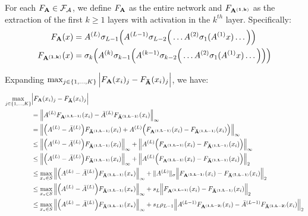 \noindent For each $F_{\bf A}\in\mathcal{F}_\mathcal{A}$, we define $F_{\bf A}$ as the entire network and $F_{\bf A^{(1, k)}}$ as the extraction of the first $k\ge 1$ layers with activation in the $k^{th}$ layer. Specifically:
\begin{align*}
    F_{\bf A}(x) &= A^{(L)}\sigma_{L-1}\Big( A^{(L-1)}\sigma_{L-2}\Big(  \dots A^{(2)}\sigma_1(A^{(1)}x) \dots \Big) \Big) \\   
    F_{\bf A^{(1, k)}}(x) &= \sigma_k\Big( 
        A^{(k)}\sigma_{k-1}\Big( A^{(k-1)}\sigma_{k-2}\Big( \dots A^{(2)}\sigma_1(A^{(1)}x) \dots \Big) \Big)
     \Big)
\end{align*}

\noindent Expanding $\max_{j\in\{1, \dots, K\}}\Big| F_{\bf A}(x_i)_j - F_{\bf \bar A}(x_i)_j \Big|$, we have:
\begin{align*}
    \max_{j\in\{1, \dots, K\}}&\Big|  F_{\bf A}(x_i)_j - F_{\bf \bar A}(x_i)_j  \Big| \\
        &=  \Big\|
            A^{(L)}F_{\bf A^{(1, L-1)}}(x_i) - {\bar A}^{(L)}F_{\bf {\bar A}^{(1, L-1)}}(x_i)
        \Big\|_\infty \\
        &= \Big\|
            \Big( A^{(L)}-{\bar A}^{(L)} \Big)F_{\bf {\bar A}^{(1, L-1)}}(x_i) + A^{(L)}\Big( F_{\bf A^{(1, L-1)}}(x_i) - F_{\bf {\bar A}^{(1, L-1)}}(x_i) \Big)
        \Big\|_\infty \\
        &\le \Big\|
            \Big( A^{(L)}-{\bar A}^{(L)} \Big)F_{\bf {\bar A}^{(1, L-1)}}(x_i) 
        \Big\|_\infty
        + 
        \Big\|
            A^{(L)}\Big( F_{\bf A^{(1, L-1)}}(x_i) - F_{\bf {\bar A}^{(1, L-1)}}(x_i) \Big)
        \Big\|_\infty \\
        &\le \Big\|
            \Big( A^{(L)}-{\bar A}^{(L)} \Big)F_{\bf {\bar A}^{(1, L-1)}}(x_i) 
        \Big\|_\infty
        + 
        \Big\|
            A^{(L)}\Big( F_{\bf A^{(1, L-1)}}(x_i) - F_{\bf {\bar A}^{(1, L-1)}}(x_i) \Big)
        \Big\|_2 \\
        &\le \max_{x_*\in S}\Big\|
            \Big( A^{(L)}-{\bar A}^{(L)} \Big)F_{\bf {\bar A}^{(1, L-1)}}(x_*)
        \Big\|_\infty + \|A^{(L)}\|_\sigma\Big\|
            F_{\bf A^{(1, L-1)}}(x_i) - F_{\bf {\bar A}^{(1, L-1)}}(x_i)
        \Big\|_2 \\
        &\le \max_{x_*\in S}\Big\|
            \Big( A^{(L)}-{\bar A}^{(L)} \Big)F_{\bf {\bar A}^{(1, L-1)}}(x_*)
        \Big\|_\infty + s_L \Big\|
            F_{\bf A^{(1, L-1)}}(x_i) - F_{\bf {\bar A}^{(1, L-1)}}(x_i)
        \Big\|_2 \\
        &\le \max_{x_*\in S}\Big\|
            \Big( A^{(L)}-{\bar A}^{(L)} \Big)F_{\bf {\bar A}^{(1, L-1)}}(x_*)
        \Big\|_\infty + s_L\rho_{L-1} \Big\|
            A^{(L-1)}F_{\bf A^{(1, L-2)}}(x_i) - {\bar A}^{(L-1)}F_{\bf {\bar A}^{(1, L-2)}}(x_i) 
        \Big\|_2 \\
\end{align*}

